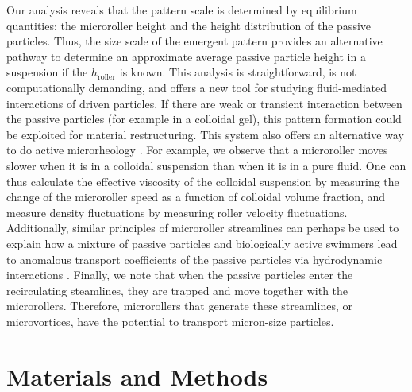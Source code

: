 \documentclass[12pt]{article}
\begin{document}
Our analysis reveals that the pattern scale is determined by equilibrium quantities: the microroller height and the height distribution of the passive particles. Thus, the size scale of the emergent pattern provides an alternative pathway to determine an approximate average passive particle height in a suspension if the $h_\mathrm{roller}$ is known. This analysis is straightforward, is not computationally demanding, and offers a new tool for studying fluid-mediated interactions of driven particles.
%
If there are weak or transient interaction between the passive particles (for example in a colloidal gel), this pattern formation could be exploited for material restructuring. %
This system also offers an alternative way to do active microrheology \cite{zia_active_2018}. For example, we observe that a microroller moves slower when it is in a colloidal suspension than when it is in a pure fluid. One can thus calculate the effective viscosity of the colloidal suspension by measuring the change of the microroller speed as a function of colloidal volume fraction, and measure density fluctuations by measuring roller velocity fluctuations.
Additionally, similar principles of microroller streamlines can perhaps be used to explain how a mixture of passive particles and biologically active swimmers lead to anomalous transport coefficients of the passive particles via hydrodynamic interactions \cite{mino_enhanced_2011, jepson_enhanced_2013}. 
Finally, we note that when the passive particles enter the recirculating steamlines, they are trapped and move together with the microrollers. Therefore, microrollers that generate these streamlines, or microvortices, have the potential to transport micron-size particles. %

\section*{Materials and Methods}
\end{document}
